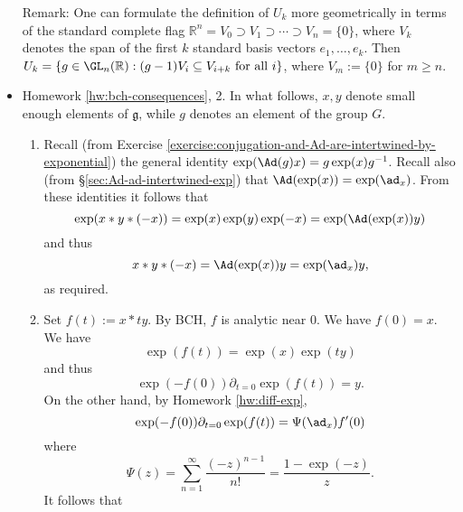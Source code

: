 \documentclass[reqno]{amsart} 
\begin{document}
\begin{itemize}
  Remark:
  One can formulate the definition
  of $U_k$  more geometrically in terms of
  the standard complete flag
  $\mathbb{R}^n = V_0 \supset V_1 \supset \dotsb \supset V_n
  = \{0\}$,
  where
  $V_k$ denotes the span
  of the first $k$ standard basis vectors $e_1,\dotsc,e_k$.
  Then $U_k = \{g  \in \GL_n(\mathbb{R}) :
  (g - 1) V_i \subseteq V_{i + k} \text{ for all } i\}$,
  where $V_m := \{0\}$ for $m \geq n$.


\item Homework \ref{hw:bch-consequences}, 2.
  In what follows,
  $x,y$ denote small enough elements of $\mathfrak{g}$,
  while $g$ denotes an element of the group $G$.
  \begin{enumerate}
  \item
    Recall (from Exercise
    \ref{exercise:conjugation-and-Ad-are-intertwined-by-exponential})
    the general identity
    $\exp(\Ad(g) x) = g \exp(x) g^{-1}$.
    Recall also (from \S\ref{sec:Ad-ad-intertwined-exp})
    that
    $\Ad(\exp(x)) = \exp(\ad_x)$.
    From these identities it follows that
    \begin{equation}
      \exp(x \ast y \ast (-x))
      = \exp(x) \exp(y) \exp(-x)
      = \exp(\Ad(\exp(x)) y)
    \end{equation}
    and thus
    \begin{equation}
x \ast y \ast (-x) = \Ad(\exp(x)) y
      = \exp(\ad_x) y,
    \end{equation}
    as required.
  \item
    Set $f(t) := x \ast t y$.
    By BCH,
    $f$ is analytic near $0$.
    We have $f(0) = x$.
    We have
    \begin{equation}
      \exp(f(t)) =  \exp(x) \exp(t y)
    \end{equation}
    and thus
    \begin{equation}
      \exp(-f(0))
      \partial_{t=0}
      \exp(f(t))
      = y.
    \end{equation}
    On the other hand,
    by Homework \ref{hw:diff-exp},
    \begin{equation}\label{eqn:consequence-of-maurer-cartan-for-computing-exp-dfdfd}
      \exp(-f(0))
      \partial_{t=0}
      \exp(f(t))
      =
      \Psi(\ad_x)
      f'(0)
    \end{equation}
    where
    \begin{equation}
      \Psi(z)
      = \sum_{n=1}^{\infty}
      \frac{(-z)^{n-1}}{n!}
      = \frac{1 - \exp(-z)}{z}.
    \end{equation}
    It follows that

\end{enumerate}
\end{itemize}
\end{document}
